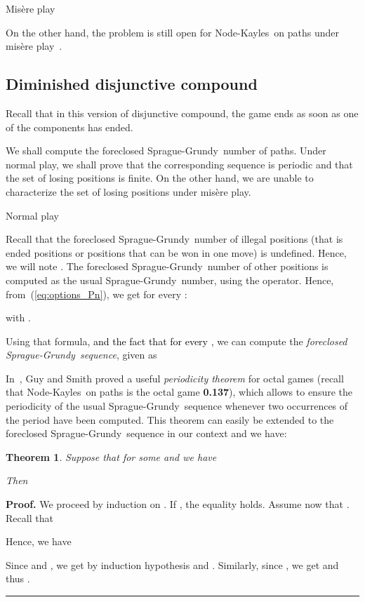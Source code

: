 \documentclass[11pt]{article}
\newcommand{\modif}[1]{\textcolor{black}{#1}}
\newcommand{\centre}[1]{\begin{center}#1\end{center}}
\newcommand{\NK}{Node-Kayles}
\newcommand{\SP}{Sprague-Grundy}
\newtheorem{theorem}{Theorem}
\newcommand\qed{\mbox{}\hfill\rule{0.5em}{0.809em}\par\vskip 5mm}
\newenvironment{proof}[0]{\noindent\textbf{Proof.}}{\qed}
\begin{document}
\vskip 4mm

\begin{center}{\sc Mis\`ere play}\end{center}

On the other hand, the problem is still open for \NK\ on
paths under mis\`ere play~\cite[Chapter 13]{WW}.


\subsection{Diminished disjunctive compound}
\label{ss:dimdis}

Recall that in this version of disjunctive compound, the game ends as soon
as one of the components has ended.

We shall compute the foreclosed \SP\ number of paths.
Under normal play, we shall prove that the corresponding sequence
is periodic and that the set of losing positions is finite.
On the other hand, we are unable to characterize the set of losing
positions under mis\`ere play.

\vskip 4mm

\centre{{\sc Normal play}}

Recall that the foreclosed \SP\ number of illegal positions (that is ended positions
or positions that can be won in one move) is undefined. Hence, we will note
.
The foreclosed \SP\ number of other positions is computed as the usual \SP\ number,
using the  operator.
Hence, from~(\ref{eq:options_Pn}), we get for every :

with .

Using that formula, 
\modif{and the fact that
 for every },
 we can compute the {\em foreclosed \SP\ sequence},
given as 


In~\cite{GUY-SMITH-56}, Guy and Smith proved a useful {\em periodicity
theorem} for octal games (recall that \NK\ on paths is the octal game
{\bf 0.137}), which allows to ensure the periodicity of the usual
\SP\ sequence whenever two occurrences of the period have been computed.
This theorem can easily be extended to the foreclosed \SP\ sequence
in our context and we have:

\begin{theorem}
Suppose that for some  and  we have

Then

\label{th:ddc_normal}
\end{theorem}

\begin{proof}
We proceed by induction on . If , the equality holds.
Assume now that . Recall that

Hence, we have


Since  and , we get by induction hypothesis
 and
.
Similarly, since , we get 
 and thus 
.
\end{proof}
\end{document}
